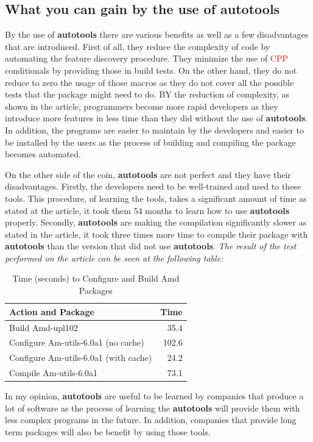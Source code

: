 \documentclass[11pt]{article}
\begin{document}
\subsection{What you can gain by the use of autotools}
By the use of \textbf{autotools} there are various benefits as well as a few disadvantages that are introduced. First of all, they reduce the complexity of code by automating the feature discovery procedure. They minimize the use of \textcolor{red}{CPP} conditionals by providing those in build tests. On the other hand, they do not reduce to zero the usage of those macros as they do not cover all the possible tests that the package might need to do. BY the reduction of complexity, as shown in the article, programmers become more rapid developers as they introduce more features in less time than they did without the use of \textbf{autotools}. In addition, the programs are easier to maintain by the developers and easier to be installed by the users as the process of building and compiling the package becomes automated.

On the other side of the coin, \textbf{autotools} are not perfect and they have their disadvantages. Firstly, the developers need  to be well-trained and used to these tools. This procedure, of learning the tools, takes a significant amount of time as stated at the article, it took them 54 months to learn how to use \textbf{autotools} properly. Secondly, \textbf{autotools} are making the compilation significantly slower as stated in the article, it took three times more time to compile their package with \textbf{autotools} than the version that did not use \textbf{autotools}. \textit{The result of the test performed on the article can be seen at the following table:}

\begin{table}
\centering

\begin{tabular}{|l|r|}
\hline
Action and Package & Time\\ \hline
Build Amd-upl102 & 35.4\\ \hline
Configure Am-utils-6.0a1 (no cache) & 102.6\\
Configure Am-utils-6.0a1 (with cache) & 24.2\\
Compile Am-utils-6.0a1 & 73.1\\ \hline
\end{tabular}
\caption{Time (seconds) to Configure and Build Amd Packages \cite{zadok2002}}
\label{table:buildTest}
\end{table}

In my opinion, \textbf{autotools} are useful to be learned by companies that produce a lot of software as the process of learning the \textbf{autotools} will provide them with less complex programs in the future. In addition, companies that provide long term packages will also be benefit by using those tools.

\nocite{*}


\end{document}
